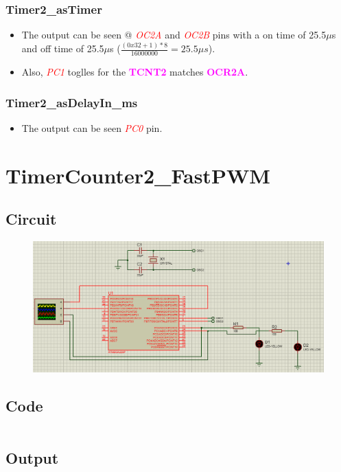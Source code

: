\documentclass[oneside]{book}
\newcommand{\pinFormat}[1]{\emph{\textcolor{red}{#1}}}
\newcommand{\regFormat}[1]{\textbf{\textcolor{magenta}{#1}}}
\begin{document}
\subsubsection{Timer2\_asTimer}
\begin{itemize}
    \item The output can be seen @ \pinFormat{OC2A} and \pinFormat{OC2B} pins with a on time of 25.5$\mu$s and off time of 25.5$\mu$s ($\frac{(0x32+1) * 8}{16000000} = 25.5\mu s$).
    \item Also, \pinFormat{PC1} toglles for the \regFormat{TCNT2} matches \regFormat{OCR2A}.
\end{itemize}
\subsubsection{Timer2\_asDelayIn\_ms}
\begin{itemize}
    \item The output can be seen \pinFormat{PC0} pin.
\end{itemize}


\section{TimerCounter2\_FastPWM}
\subsection{Circuit}
\begin{figure}[H]
    \centering
    \includegraphics[height=0.2\textheight]{TimerCounter2_FastPWM.png}
\end{figure}
\subsection{Code}
\inputminted[breaklines, bgcolor=black]{c}{./programFiles/TimerCounter2_FastPWM.c}
\subsection{Output}
\end{document}
